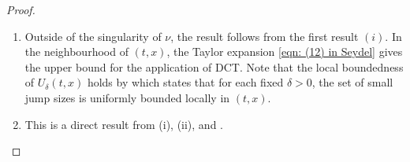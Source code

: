 \begin{proof}
\begin{enumerate}[label=(\roman*)]
        For the LSC case, we have
        \begin{align*}
            & \liminf_{k \rightarrow \infty} \mathcal{I}^{2,\delta}[t_k,x_k,p_k,v(t_k,\cdot)] \\
            &\quad =\liminf_{k \rightarrow \infty} \int\limits_{|z| \geq \delta} \big( v(t_k,x_k+\gamma(t_k,x_k,z)) - v(t_k,x_k) - \langle p_k, \gamma(t_k,x_k,z) \rangle \ind{|z| < 1} \big) \nu (\diff z) \\
            &\quad \geq \int\limits_{|z| \geq \delta} \liminf_{k \rightarrow \infty} \big( v(t_k,x_k+\gamma(t_k,x_k,z)) - v(t_k,x_k) - \langle p_k, \gamma(t_k,x_k,z) \rangle \ind{|z| < 1} \big) \nu(\diff z) \\
            &\quad = \int\limits_{|z| \geq \delta} \big( v(t,x+\gamma(t,x,z)) - v(t,z) - \langle p, \gamma(t,x,z) \rangle \ind{|z|>1} \big) \nu(\diff z) \\
            &\quad = \mathcal{I}^{2,\delta} [t,x,p,v(t,\cdot)]. 
        \end{align*}
        where the inequality results from the direct application of Fatou's Lemma. 

        For the second assertion, the result for $\varphi_k$ follows from the monotonous property of $\{\varphi_k\}_{k \geq 0}$ and the assumption that $\varphi_k$ converges pointwise to $u$. Applying Dini's Theorem, see {\cite[Theorem 7.3]{dibenedetto2002real}}, one finds that the convergence is uniform, which results in 
        \begin{equation*}
            \limsup_{k \rightarrow \infty} \varphi_k(t_k,x_k) \leq u(t,x),
        \end{equation*}
        and 
        \begin{equation*}
            \limsup_{k \rightarrow \infty} \varphi_k(t_k,x_k + \gamma(t_k,x_k,z)) \leq u(t,x).
        \end{equation*}
        Hence \eqref{eqn: (33) in Seydel} holds. A similar logic is applied to obtain \eqref{eqn: (34) in Seydel}. 

    \item Outside of the singularity of  $\nu$, the result follows from the first result $(i)$. In the neighbourhood of $(t,x)$, the Taylor expansion \eqref{eqn: (12) in Seydel} gives the upper bound for the application of DCT. Note that the local boundedness of $U_\delta(t,x)$ holds by  which states that for each fixed $\delta > 0$, the set of small jump sizes is uniformly bounded locally in $(t,x)$. 

    \item This is a direct result from (i), (ii), and . 
    \end{enumerate}
\end{proof}

